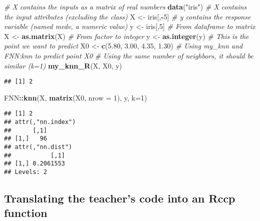 \documentclass[]{article}
\newenvironment{Shaded}{\begin{snugshade}}{\end{snugshade}}
\newcommand{\CommentTok}[1]{\textcolor[rgb]{0.56,0.35,0.01}{\textit{#1}}}
\newcommand{\DataTypeTok}[1]{\textcolor[rgb]{0.13,0.29,0.53}{#1}}
\newcommand{\DecValTok}[1]{\textcolor[rgb]{0.00,0.00,0.81}{#1}}
\newcommand{\FloatTok}[1]{\textcolor[rgb]{0.00,0.00,0.81}{#1}}
\newcommand{\KeywordTok}[1]{\textcolor[rgb]{0.13,0.29,0.53}{\textbf{#1}}}
\newcommand{\NormalTok}[1]{#1}
\newcommand{\OperatorTok}[1]{\textcolor[rgb]{0.81,0.36,0.00}{\textbf{#1}}}
\newcommand{\StringTok}[1]{\textcolor[rgb]{0.31,0.60,0.02}{#1}}
\begin{document}
\begin{Shaded}
\begin{Highlighting}[]
\CommentTok{# X contains the inputs as a matrix of real numbers}
\KeywordTok{data}\NormalTok{(}\StringTok{"iris"}\NormalTok{)}
\CommentTok{# X contains the input attributes (excluding the class)}
\NormalTok{X <-}\StringTok{ }\NormalTok{iris[,}\OperatorTok{-}\DecValTok{5}\NormalTok{]}
\CommentTok{# y contains the response variable (named medv, a numeric value)}
\NormalTok{y <-}\StringTok{ }\NormalTok{iris[,}\DecValTok{5}\NormalTok{]}
\CommentTok{# From dataframe to matrix}
\NormalTok{X <-}\StringTok{ }\KeywordTok{as.matrix}\NormalTok{(X)}
\CommentTok{# From factor to integer}
\NormalTok{y <-}\StringTok{ }\KeywordTok{as.integer}\NormalTok{(y)}
\CommentTok{# This is the point we want to predict}
\NormalTok{X0 <-}\StringTok{ }\KeywordTok{c}\NormalTok{(}\FloatTok{5.80}\NormalTok{, }\FloatTok{3.00}\NormalTok{, }\FloatTok{4.35}\NormalTok{, }\FloatTok{1.30}\NormalTok{)}
\CommentTok{# Using my_knn and FNN:knn to predict point X0}
\CommentTok{# Using the same number of neighbors, it should be similar (k=1)}
\KeywordTok{my_knn_R}\NormalTok{(X, X0, y)}
\end{Highlighting}
\end{Shaded}

\begin{verbatim}
## [1] 2
\end{verbatim}

\begin{Shaded}
\begin{Highlighting}[]
\NormalTok{FNN}\OperatorTok{::}\KeywordTok{knn}\NormalTok{(X, }\KeywordTok{matrix}\NormalTok{(X0, }\DataTypeTok{nrow =} \DecValTok{1}\NormalTok{), y, }\DataTypeTok{k=}\DecValTok{1}\NormalTok{)}
\end{Highlighting}
\end{Shaded}

\begin{verbatim}
## [1] 2
## attr(,"nn.index")
##      [,1]
## [1,]   96
## attr(,"nn.dist")
##           [,1]
## [1,] 0.2061553
## Levels: 2
\end{verbatim}

\newpage

\hypertarget{translating-the-teachers-code-into-an-rccp-function}{%
\subsection{Translating the teacher's code into an Rccp
function}\label{translating-the-teachers-code-into-an-rccp-function}}
\end{document}

